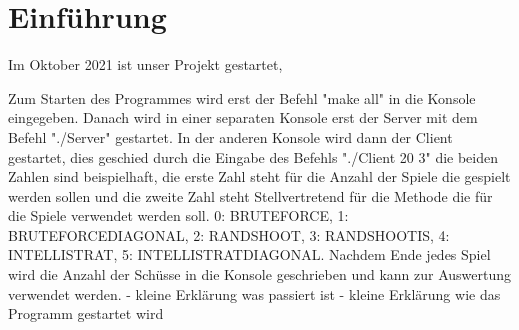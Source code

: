 \section*{Einführung}
Im Oktober 2021 ist unser Projekt gestartet, 

Zum Starten des Programmes wird erst der Befehl "make all" in die Konsole eingegeben. Danach wird in einer separaten Konsole erst der Server mit dem Befehl "./Server" gestartet. In der anderen Konsole wird dann der Client gestartet, dies geschied durch die Eingabe des Befehls "./Client 20 3" die beiden Zahlen sind beispielhaft, die erste Zahl steht für die Anzahl der Spiele die gespielt werden sollen und die zweite Zahl steht Stellvertretend für die Methode die für die Spiele verwendet werden soll. 0: BRUTEFORCE, 1: BRUTEFORCEDIAGONAL, 2: RANDSHOOT, 3: RANDSHOOTIS, 4: INTELLISTRAT, 5: INTELLISTRATDIAGONAL. Nachdem Ende jedes Spiel wird die Anzahl der Schüsse in die Konsole geschrieben und kann zur Auswertung verwendet werden.
- kleine Erklärung was passiert ist
- kleine Erklärung wie das Programm gestartet wird

